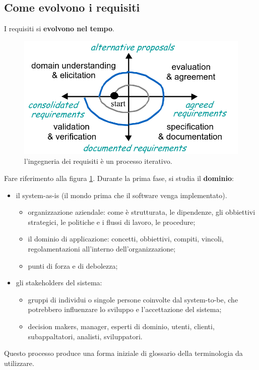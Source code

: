 \documentclass[italian]{article}
\begin{document}
	\subsection{Come evolvono i requisiti}
		I requisiti si \textbf{evolvono nel tempo}.
		\begin{figure}[th]
			\centering
			\includegraphics[width=0.7\linewidth]{img/cycle-requirements}
			\caption{l'ingegneria dei requisiti è un processo iterativo.}
			\label{fig:cycle-requirements}
		\end{figure}

		 Fare riferimento alla figura \ref{fig:cycle-requirements}. Durante la prima fase, si studia il \textbf{dominio}:
		 \begin{itemize}
		 	\item il system-as-is (il mondo prima che il software venga implementato).
		 	\begin{itemize}
		 		\item organizzazione aziendale: come è strutturata, le dipendenze, gli obbiettivi strategici, le politiche e i flussi di lavoro, le procedure;
		 		\item il dominio di applicazione: concetti, obbiettivi, compiti, vincoli, regolamentazioni all'interno dell'organizzazione;
		 		\item punti di forza e di debolezza;
		 	\end{itemize}
		 	\item gli stakeholders del sistema:
		 	\begin{itemize}
		 		\item gruppi di individui o singole persone coinvolte dal system-to-be, che potrebbero influenzare lo sviluppo e l'accettazione del sistema;
		 		\item decision makers, manager, esperti di dominio, utenti, clienti, subappaltatori, analisti, sviluppatori.
		 	\end{itemize}
		 \end{itemize}
		 Questo processo produce una forma iniziale di glossario della terminologia da utilizzare.
\end{document}
